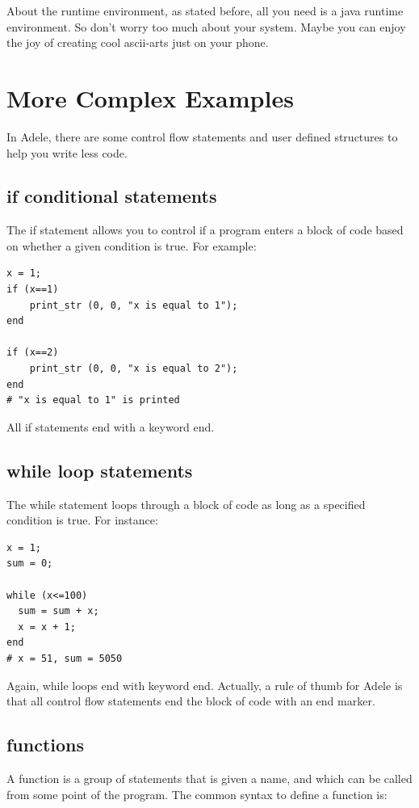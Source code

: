 \documentclass[11pt,letterpaper]{article}
\begin{document}
About the runtime environment, as stated before, all you need is a java runtime environment. So don't worry too much about your system. Maybe you can enjoy the joy of creating cool ascii-arts just on your phone.

\section {More Complex Examples}

In Adele, there are some control flow statements and user defined structures to help you write less code.

\subsection {if conditional statements}

The if statement allows you to control if a program enters a block of code based on whether a given condition is true. For example:

\begin{lstlisting}[caption=if.adl, label=if, captionpos=b, tabsize=4, frame=single]
x = 1;
if (x==1)
	print_str (0, 0, "x is equal to 1");
end

if (x==2)
	print_str (0, 0, "x is equal to 2");
end
# "x is equal to 1" is printed
\end{lstlisting}

All if statements end with a keyword end.

\subsection {while loop statements}

The while statement loops through a block of code as long as a specified condition is true. For instance:

\begin{lstlisting}[caption=while.adl, label=while, captionpos=b, tabsize=4, frame=single]
x = 1;
sum = 0;

while (x<=100)
  sum = sum + x;
  x = x + 1;
end
# x = 51, sum = 5050
\end{lstlisting}

Again, while loops end with keyword end. Actually, a rule of thumb for Adele is that all control flow statements end the block of code with an end marker.

\subsection {functions}
A function is a group of statements that is given a name, and which can be called from some point of the program. The common syntax to define a function is:
\end{document}
